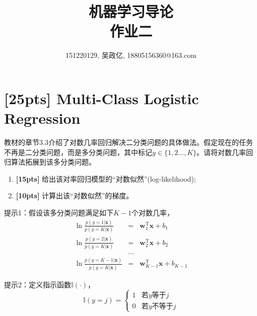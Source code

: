 \documentclass[a4paper,UTF8]{article}
\numberwithin{equation}{section}
\begin{document}
\title{机器学习导论\\
作业二}
\author{151220129, 吴政亿, 18805156360@163.com}
\maketitle

\section{[25pts] Multi-Class Logistic Regression}
教材的章节3.3介绍了对数几率回归解决二分类问题的具体做法。假定现在的任务不再是二分类问题，而是多分类问题，其中标记$y\in\{1,2\dots,K\}$。请将对数几率回归算法拓展到该多分类问题。

\begin{enumerate}[(1)]
	\item \textbf{[15pts]} 给出该对率回归模型的“对数似然”(log-likelihood);
	\item \textbf{[10pts]} 计算出该“对数似然”的梯度。
\end{enumerate}

提示1：假设该多分类问题满足如下$K-1$个对数几率，
\begin{eqnarray*}
	\ln\frac{p(y=1|\mathbf{x})}{p(y=K|\mathbf{x})}&=&\mathbf{w}_1^\mathrm{T}\mathbf{x}+b_1\\
	\ln\frac{p(y=2|\mathbf{x})}{p(y=K|\mathbf{x})}&=&\mathbf{w}_2^\mathrm{T}\mathbf{x}+b_2\\
	&\dots&\\
	\ln\frac{p(y={K-1}|\mathbf{x})}{p(y=K|\mathbf{x})}&=&\mathbf{w}_{K-1}^\mathrm{T}\mathbf{x}+b_{K-1}
\end{eqnarray*}

提示2：定义指示函数$\mathbb{I}(\cdot)$，
$$\mathbb{I}(y=j)=
\begin{cases}
1& \text{若$y$等于$j$}\\
0& \text{若$y$不等于$j$}
\end{cases}$$
\end{document}
